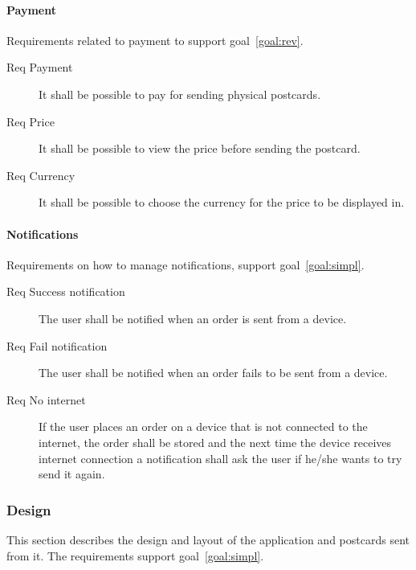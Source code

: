 \documentclass[10pt,a4paper]{article}
\begin{document}
\paragraph{Payment}
Requirements related to payment to support goal~\ref{goal:rev}.
\begin{description}
\item [Req \thesubsubsection {} Payment] It shall be possible to pay for sending physical postcards.
	
\item [Req \thesubsubsection {} Price] It shall be possible to view the price before sending the postcard.
	
\item [Req \thesubsubsection {} Currency] It shall be possible to choose the currency for the price to be displayed in.
	
\end{description}

\paragraph{Notifications}
Requirements on how to manage notifications, support goal~\ref{goal:simpl}.

\begin{description}


	\item [Req \thesubsubsection {} Success notification] The user shall be notified when an order is sent from a device.

	\item [Req \thesubsubsection {} Fail notification] The user shall be notified when an order fails to be sent from a device.


	\item [Req \thesubsubsection {} No internet] If the user places an order on a device that is not connected to the internet, the order shall be stored and the next time the device receives internet connection a notification shall ask the user if he/she wants to try send it again. 

\end{description}

\subsubsection{Design}
This section describes the design and layout of the application and postcards sent from it. The requirements support goal~\ref{goal:simpl}. 
\end{document}
